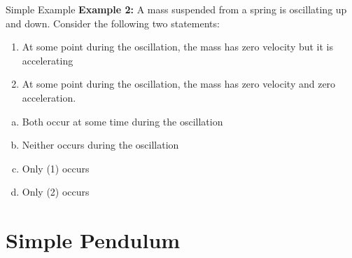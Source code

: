 \documentclass[12pt,compress,aspectratio=169]{beamer}
\begin{document}
\begin{frame}{Simple Example}
  \textbf{Example 2:} A mass suspended from a spring is oscillating up and
  down. Consider the following two statements:
  \begin{enumerate}
  \item At some point during the oscillation, the mass has zero velocity but it
    is accelerating
  \item At some point during the oscillation, the mass has zero velocity and
    zero acceleration.
  \end{enumerate}

  \begin{enumerate}[(a)]
  \item Both occur at some time during the oscillation
  \item Neither occurs during the oscillation
  \item Only (1) occurs
  \item Only (2) occurs
  \end{enumerate}
\end{frame}






\section{Simple Pendulum}
\end{document}
